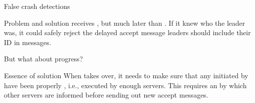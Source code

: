 \begin{slide}{False crash detections}
  \centering{}
  \begin{block}{Problem and solution}
     receives , but much later than
    . If it knew who the  leader was, it could safely reject
    the delayed accept message \mathexpr{\Rightarrow} leaders should include their ID in messages.
  \end{block}
\end{slide}
\begin{slide}{But what about progress?}
  \centering{}
  \begin{block}{Essence of solution}
    When  takes over, it needs to make sure that any  initiated by
     have been properly , i.e., executed by enough servers. This requires an
     by which other servers are informed before sending out new accept
    messages.
  \end{block}
\end{slide}
